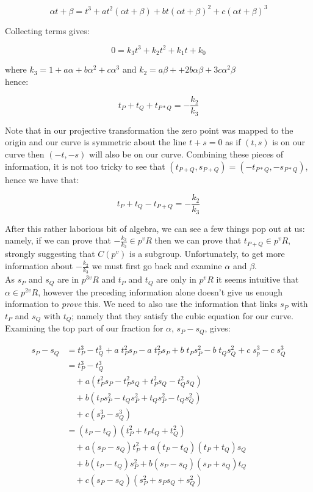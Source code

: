 \documentclass{article}
\begin{document}
\[ \alpha t + \beta = t^3 + a t^2 (\alpha t + \beta) + b t (\alpha t + \beta)^2 + c (\alpha t + \beta)^3 \]

Collecting terms gives:

\[ 0 = k_3 t^3 + k_2 t^2 + k_1 t + k_0 \]

where $k_3 = 1 + a \alpha + b \alpha^2 + c \alpha^3$ and $k_2 = a \beta + + 2 b \alpha \beta + 3c \alpha^2 \beta$\\

hence: 

\[ t_P + t_Q + t_{P*Q} = -\frac{k_2}{k_3} \]

Note that in our projective transformation the zero point was mapped to the origin and our curve is symmetric about the line $t + s = 0$ as if $(t, s)$ is on our curve then $(-t, -s)$ will also be on our curve. Combining these pieces of information, it is not too tricky to see that $(t_{P + Q}, s_{P + Q}) = (-t_{P * Q}, -s_{P * Q})$, hence we have that:

\[ t_P + t_Q - t_{P+Q} = -\frac{k_2}{k_3} \]

After this rather laborious bit of algebra, we can see a few things pop out at us: namely, if we can prove that $-\frac{k_2}{k_3} \in p^v R$ then we can prove that $t_{P+Q} \in p^v R$, strongly suggesting that $C(p^v)$ is a subgroup. Unfortunately, to get more information about $-\frac{k_2}{k_3}$ we must first go back and examine $\alpha$ and $\beta$. \\

As $s_P$ and $s_Q$ are in $p^{3v}R$ and $t_P$ and $t_Q$ are only in $p^v R$ it seems intuitive that $\alpha \in p^{2v}R$, however the preceding information alone doesn't give us enough information to \emph{prove} this. We need to also use the information that links $s_P$ with $t_P$ and $s_Q$ with $t_Q$; namely that they satisfy the cubic equation for our curve. Examining the top part of our fraction for $\alpha$, $s_P - s_Q$, gives:

\begin{align*} 
s_P - s_Q &= t_P^3 - t_Q^3 + a \; t_P^2 s_P - a \; t_P^2 s_P + b \; t_P s_P^2 - b \; t_Q s_Q^2 + c \; s_p^3 - c \; s_Q^3 \\
&= t_P^3 - t_Q^3 \\
& \quad + a(t_P^2 s_P - t_P^2 s_Q + t_P^2 s_Q - t_Q^2 s_Q) \\
& \quad + b(t_P s_P^2 - t_Q s_P^2 + t_Q s_P^2 - t_Q s_Q^2) \\
& \quad + c(s_P^3 - s_Q^3) \\
&= (t_P - t_Q)(t_P^2 + t_P t_Q + t_Q^2) \\
& \quad + a(s_P - s_Q)t_P^2 + a(t_P - t_Q)(t_P + t_Q)s_Q \\
& \quad + b(t_P - t_Q)s_P^2 + b(s_P - s_Q)(s_P + s_Q)t_Q \\
& \quad + c(s_P - s_Q)(s_P^2 + s_P s_Q + s_Q ^2)
\end{align*} 
\end{document}
